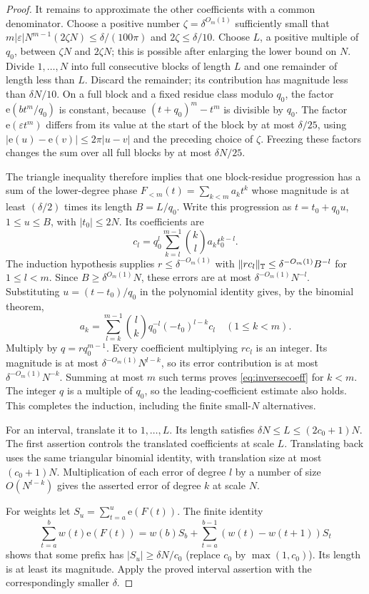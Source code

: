 \documentclass[11pt,oneside]{article}
\theoremstyle{definition}\newtheorem{definition}[theorem]{Definition}
\theoremstyle{remark}\newtheorem{remark}[theorem]{Remark}
\newcommand{\ee}[1]{\mathrm e\!\left(#1\right)}
\begin{document}
\begin{proof}
It remains to approximate the other coefficients with a common denominator.
Choose a positive number $\zeta=\delta^{O_m(1)}$ sufficiently small that
$m|\varepsilon|N^{m-1}(2\zeta N)\leq\delta/(100\pi)$ and
$2\zeta\leq\delta/10$. Choose $L$, a positive multiple of $q_0$, between
$\zeta N$ and $2\zeta N$; this is possible after enlarging the lower bound
on $N$. Divide $1,\ldots,N$ into full consecutive blocks of length $L$ and
one remainder of length less than $L$. Discard the remainder; its contribution
has magnitude less than $\delta N/10$. On a full block and a fixed residue
class modulo $q_0$, the factor $\ee{b t^m/q_0}$ is constant, because
$(t+q_0)^m-t^m$ is divisible by $q_0$. The factor $\ee{\varepsilon t^m}$
differs from its value at the start of the block by at most $\delta/25$,
using $|\ee{u}-\ee{v}|\leq2\pi|u-v|$ and the preceding choice of $\zeta$.
Freezing these factors changes the sum over all full blocks by at most
$\delta N/25$.

The triangle inequality therefore implies that one block-residue progression
has a sum of the lower-degree phase $F_{<m}(t)=\sum_{k<m}a_kt^k$ whose
magnitude is at least $(\delta/2)$ times its length $B=L/q_0$.
Write this progression as $t=t_0+q_0u$, $1\leq u\leq B$, with $|t_0|\leq2N$.
Its coefficients are
\[
 c_l=q_0^l\sum_{k=l}^{m-1}\binom{k}{l}a_k t_0^{k-l}.
\]
The induction hypothesis supplies $r\leq\delta^{-O_m(1)}$ with
$\|r c_l\|_\mathbb T\leq\delta^{-O_m(1)}B^{-l}$ for $1\leq l<m$.
Since $B\geq\delta^{O_m(1)}N$, these errors are at most
$\delta^{-O_m(1)}N^{-l}$. Substituting $u=(t-t_0)/q_0$ in the polynomial
identity gives, by the binomial theorem,
\[
 a_k=\sum_{l=k}^{m-1}\binom{l}{k}q_0^{-l}(-t_0)^{l-k}c_l
 \quad(1\leq k<m).
\]
Multiply by $q=rq_0^{m-1}$. Every coefficient multiplying $r c_l$ is an
integer. Its magnitude is at most $\delta^{-O_m(1)}N^{l-k}$, so its error
contribution is at most $\delta^{-O_m(1)}N^{-k}$. Summing at most $m$ such
terms proves \eqref{eq:inversecoeff} for $k<m$. The integer $q$ is a multiple
of $q_0$, so the leading-coefficient estimate also holds. This completes
the induction, including the finite small-$N$ alternatives.

For an interval, translate it to $1,\ldots,L$. Its length satisfies
$\delta N\leq L\leq(2c_0+1)N$. The first assertion controls the translated
coefficients at scale $L$. Translating back uses the same triangular binomial
identity, with translation size at most $(c_0+1)N$. Multiplication of each
error of degree $l$ by a number of size $O(N^{l-k})$ gives the asserted
error of degree $k$ at scale $N$.

For weights let $S_u=\sum_{t=a}^u\ee{F(t)}$. The finite identity
\[
 \sum_{t=a}^b w(t)\ee{F(t)}
   =w(b)S_b+\sum_{t=a}^{b-1}(w(t)-w(t+1))S_t
\]
shows that some prefix has $|S_u|\geq\delta N/c_0$ (replace $c_0$ by
$\max(1,c_0)$). Its length is at least its magnitude. Apply the proved
interval assertion with the correspondingly smaller $\delta$.
\end{proof}
\end{document}

